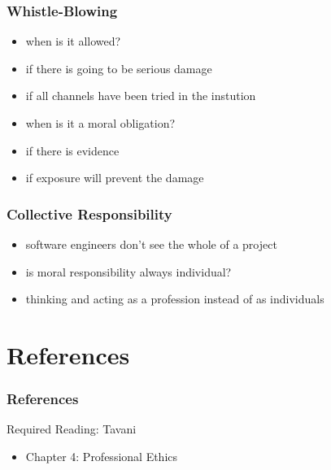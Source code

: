 \documentclass[dvipsnames]{beamer}
\theoremstyle{plain}
\begin{document}
\begin{frame}
  \frametitle{Whistle-Blowing}

  \begin{itemize}
    \item when is it allowed?
    \smallskip
    \item if there is going to be serious damage
    \item if all channels have been tried in the instution

    \pause
    \bigskip
    \item when is it a moral obligation?
    \smallskip
    \item if there is evidence
    \item if exposure will prevent the damage
  \end{itemize}
\end{frame}

\begin{frame}
  \frametitle{Collective Responsibility}

  \begin{itemize}
    \item software engineers don't see the whole of a project
    \item is moral responsibility always individual?

    \pause
    \medskip
    \item thinking and acting as a profession instead of as individuals
  \end{itemize}
\end{frame}

\section*{References}

\begin{frame}
  \frametitle{References}

  \begin{block}{Required Reading: Tavani}
    \begin{itemize}
      \item Chapter 4: \alert{Professional Ethics}
    \end{itemize}
  \end{block}
\end{frame}
\end{document}
